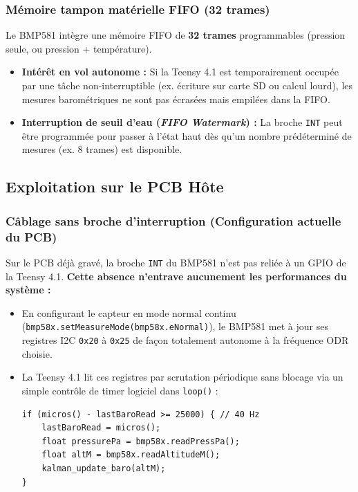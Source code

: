 \documentclass[../Materiel.tex]{subfiles}
\begin{document}
\subsubsection{Mémoire tampon matérielle FIFO (32 trames)}
Le BMP581 intègre une mémoire FIFO de \textbf{32 trames} programmables (pression seule, ou pression + température).
\begin{itemize}
    \item \textbf{Intérêt en vol autonome :} Si la Teensy 4.1 est temporairement occupée par une tâche non-interruptible (ex. écriture sur carte SD ou calcul lourd), les mesures barométriques ne sont pas écrasées mais empilées dans la FIFO.
    \item \textbf{Interruption de seuil d'eau (\textit{FIFO Watermark}) :} La broche \texttt{INT} peut être programmée pour passer à l'état haut dès qu'un nombre prédéterminé de mesures (ex. 8 trames) est disponible.
\end{itemize}

\subsection{Exploitation sur le PCB Hôte}

\subsubsection{Câblage sans broche d'interruption (Configuration actuelle du PCB)}
Sur le PCB déjà gravé, la broche \texttt{INT} du BMP581 n'est pas reliée à un GPIO de la Teensy 4.1. 
\textbf{Cette absence n'entrave aucunement les performances du système :}
\begin{itemize}
    \item En configurant le capteur en mode normal continu (\texttt{bmp58x.setMeasureMode(bmp58x.eNormal)}), le BMP581 met à jour ses registres I2C \texttt{0x20} à \texttt{0x25} de façon totalement autonome à la fréquence ODR choisie.
    \item La Teensy 4.1 lit ces registres par scrutation périodique sans blocage via un simple contrôle de timer logiciel dans \texttt{loop()} :
\begin{lstlisting}
if (micros() - lastBaroRead >= 25000) { // 40 Hz
    lastBaroRead = micros();
    float pressurePa = bmp58x.readPressPa();
    float altM = bmp58x.readAltitudeM();
    kalman_update_baro(altM);
}
\end{lstlisting}
\end{itemize}
\end{document}
